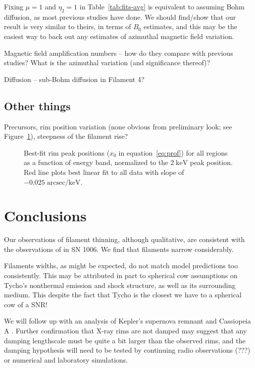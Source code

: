 \documentclass[iop, apj, numberedappendix, twocolappendix]{emulateapj}
\newcommand*{\mt}{\mathrm}
\newcommand*{\unit}[1]{\;\mt{#1}}  %
\begin{document}
Fixing $\mu = 1$ and $\eta_2 = 1$ in Table~\ref{tab:fits-avg} is equivalent to
assuming Bohm diffusion, as most previous studies have done.
We should find/show that our result is very similar to theirs, in terms of
$B_0$ estimates, and this may be the easiest way to back out any estimates of
azimuthal magnetic field variation.

Magnetic field amplification numbers -- how do they compare with previous
studies?  What is the azimuthal variation (and significance thereof)?

Diffusion -- sub-Bohm diffusion in Filament 4?

\subsection{Other things}

Precursors, rim position variation (none obvious from preliminary look; see
Figure~\ref{fig:peak-pos}), steepness of the filament rise?

\begin{figure}[ht]
    \centering
    \caption{Best-fit rim peak positions ($x_0$ in equation~\eqref{eq:prof})
        for all regions as a function of energy band, normalized to the $2
        \unit{keV}$ peak position.  Red line plots best linear fit to all data
        with slope of $-0.025 \unit{arcsec/keV}$.
        \label{fig:peak-pos}}
\end{figure}

\section{Conclusions}

Our observations of filament thinning, although qualitative, are consistent
with the observations of \citet{ressler2014} in SN 1006.
We find that filaments narrow considerably.

Filaments widths, as might be expected, do not match model predictions too
consistently.  This may be attributed in part to spherical cow assumptions on
Tycho's nonthermal emission and shock structure, as well as its surrounding
medium.  This despite the fact that Tycho is the closest we have to a spherical
cow of a SNR!

We will follow up with an analysis of Kepler's supernova remnant and
Cassiopeia A \citep[see][]{araya2010}.  Further confirmation that X-ray rims
are not damped may suggest that any damping lengthscale must be quite a bit
larger than the observed rims, and the damping hypothesis will need to be
tested by continuing radio observations (???) or numerical and laboratory
simulations.
\end{document}
